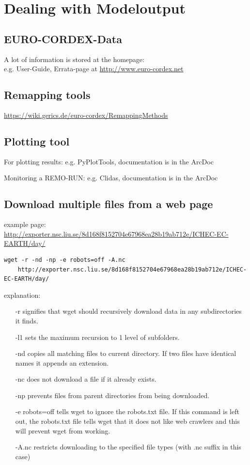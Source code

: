 \section{Dealing with Modeloutput}

\subsection{EURO-CORDEX-Data}
A lot of information is stored at the homepage:\\
e.g. User-Guide, Errata-page at \url{http://www.euro-cordex.net}

\subsection{Remapping tools}
\url{https://wiki.gerics.de/euro-cordex/RemappingMethods}

\subsection{Plotting tool}
 \item For plotting results: e.g. PyPlotTools, documentation is in the ArcDoc
 
 \item Monitoring a REMO-RUN: e.g. Clidas, documentation is in the ArcDoc

\subsection{Download multiple files from a web page}

example page: \url{http://exporter.nsc.liu.se/8d168f8152704e67968ea28b19ab712e/ICHEC-EC-EARTH/day/}
{\small 
\begin{verbatim}
wget -r -nd -np -e robots=off -A.nc 
    http://exporter.nsc.liu.se/8d168f8152704e67968ea28b19ab712e/ICHEC-EC-EARTH/day/
\end{verbatim}}

explanation:
\begin{itemize}
\item[-r] signifies that wget should recursively download data in any subdirectories it finds.
\item[-l1] sets the maximum recursion to 1 level of subfolders.
\item[-nd] copies all matching files to current directory. If two files have identical names it appends an extension.
\item[-nc] does not download a file if it already exists.
\item[-np] prevents files from parent directories from being downloaded.
\item[-e robots=off] tells wget to ignore the robots.txt file. If this command is left out, the robots.txt file tells wget that it does not like web crawlers and this will prevent wget from working.
\item[-A.nc] restricts downloading to the specified file types (with .nc suffix in this case)
\end{itemize}

